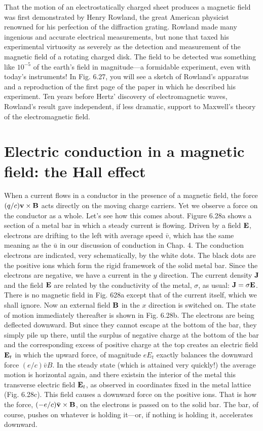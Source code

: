That the motion of an electrostatically charged sheet produces a
magnetic field was first demonstrated by Henry Rowland, the great
American physicist renowned for his perfection of the diffraction
grating. Rowland made many ingenious and accurate electrical
measurements, but none that taxed his experimental virtuosity as
severely as the detection and measurement of the magnetic field of
a rotating charged disk. The field to be detected was something like
$10^{-5}$ of the earth's field in magnitude---a formidable experiment,
even with today's instruments! In Fig. 6.27, you will see a sketch
of Rowland's apparatus and a reproduction of the first page of the
paper in which he described his experiment. Ten years before Hertz'
discovery of electromagnetic waves, Rowland's result gave 
independent, if less dramatic, support to Maxwell's theory of the electromagnetic
field.

\section{Electric conduction in a magnetic field: the Hall effect}

When a current flows in a conductor in the presence of a magnetic
field, the force $(q/c)\mathbf{v} \times \mathbf{B}$ acts directly on the moving charge 
carriers. Yet we observe a force on the conductor as a whole. Let's
see how this comes about. Figure 6.28a shows a section of a metal
bar in which a steady current is flowing. Driven by a field $\mathbf{E}$, electrons
are drifting to the left with average speed $\bar{v}$, which has the same
meaning as the $\bar{u}$ in our discussion of conduction in Chap. 4. The
conduction electrons are indicated, very schematically, by the white
dots. The black dots are the positive ions which form the rigid framework
of the solid metal bar. Since the electrons are negative, we have
a current in the $y$ direction. The current density $\mathbf{J}$ and the field $\mathbf{E}$
are related by the conductivity of the metal, $\sigma$, as usual: $\mathbf{J}=\sigma\mathbf{E}$.
There is no magnetic field in Fig. 628a except that of the current
itself, which we shall ignore. Now an external field $\mathbf{B}$ in the $x$ direction
is switched on. The state of motion immediately thereafter is
shown in Fig. 6.28b. The electrons are being deflected downward.
But since they cannot escape at the bottom of the bar, they simply
pile up there, until the surplus of negative charge at the bottom of the
bar and the corresponding excess of positive charge at the top creates
an electric field $\mathbf{E}_t$ in which the upward force, of magnitude $eE_t$
exactly balances the downward force $(e/c)\bar{v}B$. In the steady state
(which is attained very quickly!) the average motion is horizontal
again, and there existsin the interior of the metal this transverse
electric field $\mathbf{E}_t$, as observed in coordinates fixed in the metal lattice
(Fig. 6.28c). This field causes a downward force on the positive
ions. That is how the force, $(- e/c)\bar{\mathbf{v}} \times \mathbf{B}$, on the electrons is passed
on to the solid bar. The bar, of course, pushes on whatever is holding
it---or, if nothing is holding it, accelerates downward.

